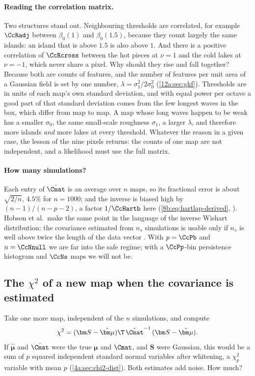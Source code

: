 \paragraph{Reading the correlation matrix.} Two structures stand out. Neighbouring thresholds are correlated, for example
$\CcRadj$ between $\beta_0(1)$ and $\beta_0(1.5)$, because they count largely the same islands: an island that is above
$1.5$ is also above $1$. And there is a positive correlation of $\CcRcross$ between the hot pieces at $\nu=1$ and the cold
lakes at $\nu=-1$, which never share a pixel. Why should they rise and fall together? Because both are counts of
features, and the number of features per unit area of a Gaussian field is set by one number, $\lambda=\sigma_1^2/2\sigma_0^2$
(\cref{12a:sec:gkf}). Thresholds are in units of each map's own standard deviation, and with equal power per octave a
good part of that standard deviation comes from the few longest waves in the box, which differ from map to map. A map whose
long waves happen to be weak has a smaller $\sigma_0$, the same small-scale roughness $\sigma_1$, a larger $\lambda$, and
therefore more islands \emph{and} more lakes at every threshold. Whatever the reason in a given case, the lesson of the
nine pixels returns: the counts of one map are not independent, and a likelihood must use the full matrix.

\paragraph{How many simulations?} Each entry of $\hat\Cmat$ is an average over $n$ maps, so its fractional error is
about $\sqrt{2/n}$, $4.5\%$ for $n=1000$; and the inverse is biased high by $(n-1)/(n-p-2)$, a factor $1/\CcHartb$ here
(\eqref{8b:eq:hartlap-derived}, \cite{Hartlap2007}). Hobson et al.\ make the same point in the language of the inverse
Wishart distribution: the covariance estimated from $n_s$ simulations is usable only if $n_s$ is well above twice the
length of the data vector . With $p=\CcPb$ and $n=\CcNnull$ we are far into the safe regime; with a
$\CcPp$-bin persistence histogram and $\CcNs$ maps we will not be.

\subsection{The $\chi^2$ of a new map when the covariance is estimated}
\label{12c:sec:hotelling}

Take one more map, independent of the $n$ simulations, and compute
\begin{equation}
  \chi^2=(\bm S-\hat{\bm\mu})\T\,\hat\Cmat^{-1}\,(\bm S-\hat{\bm\mu}) .
  \label{12c:eq:chi2}
\end{equation}
If $\hat{\bm\mu}$ and $\hat\Cmat$ were the true $\bm\mu$ and $\Cmat$, and $\bm S$ were Gaussian, this would be a sum of $p$
squared independent standard normal variables after whitening, a $\chi^2_p$ variable with mean $p$ (\cref{4a:sec:chi2-dist}).
Both estimates add noise. How much?

